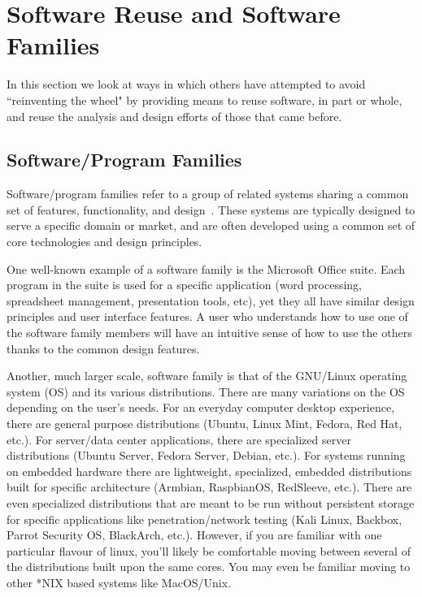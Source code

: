 \section{Software Reuse and Software Families}

In this section we look at ways in which others have attempted to avoid 
``reinventing the wheel" by providing means to reuse software, in part or 
whole, and reuse the analysis and design efforts of those that came before.

\subsection{Software/Program Families}

Software/program families refer to a group of related systems sharing a common 
set of features, functionality, and design~\cite{Pohl2005}. These systems are 
typically designed to serve a specific domain or market, and are often 
developed using a common set of core technologies and design principles.

One well-known example of a software family is the Microsoft Office suite. Each 
program in the suite is used for a specific application (word 
processing, spreadsheet management, presentation tools, etc), yet they all have 
similar design principles and user interface features. A user who understands 
how to use one of the software family members will have an intuitive sense of 
how to use the others thanks to the common design features. 

Another, much larger scale, software family is that of the GNU/Linux operating 
system (OS) and its various distributions. There are many variations on the OS 
depending on the user's needs. For an everyday computer desktop experience, 
there are general purpose distributions (Ubuntu, Linux Mint, Fedora, Red 
Hat, etc.). For server/data center applications, there are specialized server 
distributions (Ubuntu Server, Fedora Server, Debian, etc.). For systems running 
on embedded hardware there are lightweight, specialized, embedded distributions 
built for specific architecture (Armbian, RaspbianOS, RedSleeve, etc.). There 
are even specialized distributions that are meant to be run without persistent 
storage for specific applications like penetration/network testing (Kali Linux, 
Backbox, Parrot Security OS, BlackArch, etc.). However, if you are familiar 
with one particular flavour of linux, you'll likely be comfortable moving 
between several of the distributions built upon the same cores. You may even be 
familiar moving to other *NIX based systems like MacOS/Unix.

